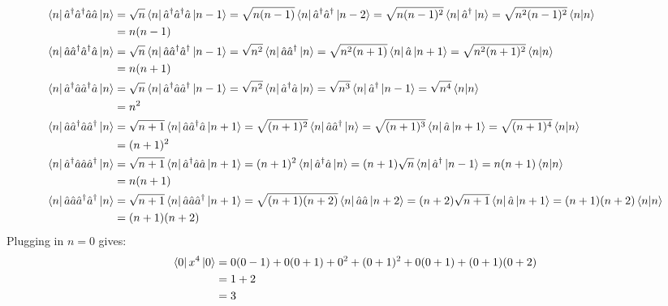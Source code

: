 \documentclass{article}
\renewcommand{\RAISE}[0]{\hat{a}^{\dagger}}
\renewcommand{\LOWER}[0]{\hat{a}}
\begin{document}
\begin{align*}
    \bra{n} \RAISE\RAISE\LOWER\LOWER \ket{n}
        &= \sqrt{n} \bra{n} \RAISE\RAISE\LOWER \ket{n-1}
         = \sqrt{n(n-1)} \bra{n} \RAISE\RAISE \ket{n-2}
         = \sqrt{n(n-1)^2} \bra{n} \RAISE \ket{n}
         = \sqrt{n^2(n-1)^2} \braket{n|n} \\
        &= n(n-1) \\
    \bra{n} \LOWER\RAISE\RAISE\LOWER \ket{n}
        &= \sqrt{n} \bra{n} \LOWER\RAISE\RAISE \ket{n-1}
         = \sqrt{n^2} \bra{n} \LOWER\RAISE \ket{n}
         = \sqrt{n^2(n+1)} \bra{n} \LOWER \ket{n+1}
         = \sqrt{n^2(n+1)^2} \braket{n|n} \\
        &= n(n+1) \\
    \bra{n} \RAISE\LOWER\RAISE\LOWER \ket{n}
        &= \sqrt{n} \bra{n} \RAISE\LOWER\RAISE \ket{n-1}
         = \sqrt{n^2} \bra{n} \RAISE\LOWER \ket{n}
         = \sqrt{n^3} \bra{n} \RAISE \ket{n-1}
         = \sqrt{n^4} \braket{n|n} \\
        &= n^2 \\
    \bra{n} \LOWER\RAISE\LOWER\RAISE \ket{n}
        &= \sqrt{n+1} \bra{n} \LOWER\RAISE\LOWER \ket{n+1}
         = \sqrt{(n+1)^2} \bra{n} \LOWER\RAISE \ket{n}
         = \sqrt{(n+1)^3} \bra{n} \LOWER \ket{n+1}
         = \sqrt{(n+1)^4} \braket{n|n} \\
        &= (n+1)^2 \\
    \bra{n} \RAISE\LOWER\LOWER\RAISE \ket{n}
        &= \sqrt{n+1} \bra{n} \RAISE\LOWER\LOWER \ket{n+1}
         = (n+1)^2 \bra{n} \RAISE\LOWER \ket{n}
         = (n+1)\sqrt{n} \bra{n} \RAISE \ket{n-1}
         = n(n+1) \braket{n|n} \\
        &= n(n+1) \\
    \bra{n} \LOWER\LOWER\RAISE\RAISE \ket{n}
        &= \sqrt{n+1} \bra{n} \LOWER\LOWER\RAISE \ket{n+1}
         = \sqrt{(n+1)(n+2)} \bra{n} \LOWER\LOWER \ket{n+2}
         = (n+2)\sqrt{n+1} \bra{n} \LOWER \ket{n+1}
         = (n+1)(n+2) \braket{n|n} \\
        &= (n+1)(n+2) \\
\end{align*}
Plugging in $n=0$ gives:
\begin{align*}
    \bra{0} x^4 \ket{0}
    &= 0(0-1) + 0(0+1) + 0^2 + (0+1)^2 + 0(0+1) + (0+1)(0+2) \\
    &= 1 + 2 \\
    &= 3
\end{align*}
\end{document}
